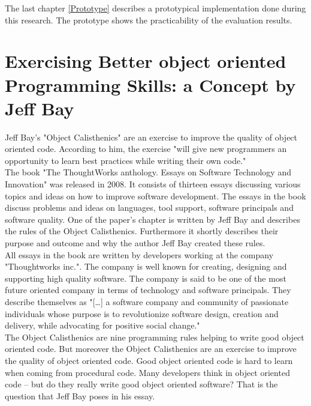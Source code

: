 The last chapter \ref{Prototype} describes a prototypical implementation done during this research. The prototype shows the practicability of the evaluation results.

\section{Exercising Better object oriented Programming Skills: a Concept by Jeff Bay}
\label{i:exercising}
Jeff Bay's "Object Calisthenics" \cite{bay2008} are an exercise to improve the quality of object oriented code. According to him, the exercise "will give new programmers an opportunity to learn best practices while writing their own code." \cite[p. 70]{bay2008}\\

The book "The ThoughtWorks anthology. Essays on Software Technology and Innovation" \cite[p. 70-79]{oc2008} was released in 2008. It consists of thirteen essays discussing various topics and ideas on how to improve software development. The essays in the book discuss problems and ideas on languages, tool support, software principals and software quality. One of the paper's chapter is written by Jeff Bay and describes the rules of the Object Calisthenics. Furthermore it shortly describes their purpose and outcome and why the author Jeff Bay created these rules.\\

All essays in the book \cite{oc2008} are written by developers working at the company "Thoughtworks inc.". The company is well known for creating, designing and supporting high quality software. The company is said to be one of the most future oriented company in terms of technology and software principals. They describe themselves as "[\dots] a software company and community of passionate individuals whose purpose is to revolutionize software design, creation and delivery, while advocating for positive social change." \cite{twWeb}\\

The Object Calisthenics are nine programming rules helping to write good object oriented code. But moreover the Object Calisthenics are an exercise to improve the quality of object oriented code. Good object oriented code is hard to learn when coming from procedural code. Many developers think in object oriented code – but do they really write good object oriented software? That is the question that Jeff Bay poses in his essay.\\

